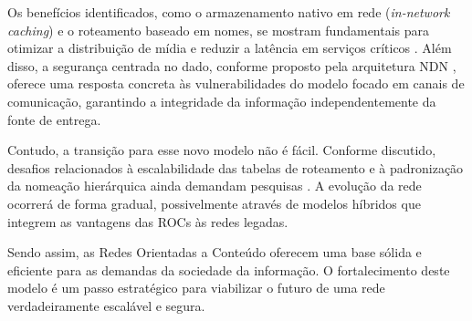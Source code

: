 \documentclass[12pt]{article}
\begin{document}
Os benefícios identificados, como o armazenamento nativo em rede (\textit{in-network caching}) e o roteamento baseado em nomes, se mostram fundamentais para otimizar a distribuição de mídia e reduzir a latência em serviços críticos \cite{brito2012redes}. Além disso, a segurança centrada no dado, conforme proposto pela arquitetura NDN \cite{jacobson2009networking}, oferece uma resposta concreta às vulnerabilidades do modelo focado em canais de comunicação, garantindo a integridade da informação independentemente da fonte de entrega.

Contudo, a transição para esse novo modelo não é fácil. Conforme discutido, desafios relacionados à escalabilidade das tabelas de roteamento e à padronização da nomeação hierárquica ainda demandam pesquisas \cite{afanasyev2018brief}. A evolução da rede ocorrerá de forma gradual, possivelmente através de modelos híbridos que integrem as vantagens das ROCs às redes legadas.

Sendo assim, as Redes Orientadas a Conteúdo oferecem uma base sólida e eficiente para as demandas da sociedade da informação. O fortalecimento deste modelo é um passo estratégico para viabilizar o futuro de uma rede verdadeiramente escalável e segura.


\end{document}
